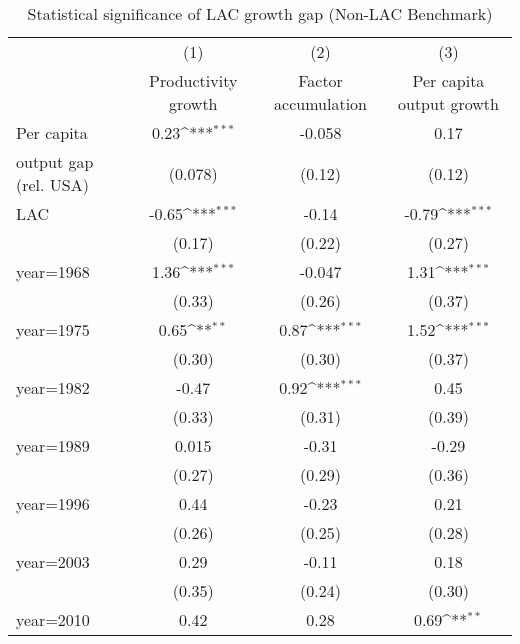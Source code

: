 \begin{table}[htbp]\centering
\def\sym#1{\ifmmode^{#1}\else\(^{#1}\)\fi}
\caption{Statistical significance of LAC growth gap (Non-LAC Benchmark)}
\begin{tabular}{l*{3}{c}}
\toprule
                &\multicolumn{1}{c}{(1)}&\multicolumn{1}{c}{(2)}&\multicolumn{1}{c}{(3)}\\
                &\multicolumn{1}{c}{Productivity growth}&\multicolumn{1}{c}{Factor accumulation}&\multicolumn{1}{c}{Per capita output growth}\\
\midrule
Per capita      &     0.23\sym{***}&   -0.058         &     0.17         \\
output gap (rel. USA)&  (0.078)         &   (0.12)         &   (0.12)         \\
\addlinespace
LAC             &    -0.65\sym{***}&    -0.14         &    -0.79\sym{***}\\
                &   (0.17)         &   (0.22)         &   (0.27)         \\
\addlinespace
year=1968       &     1.36\sym{***}&   -0.047         &     1.31\sym{***}\\
                &   (0.33)         &   (0.26)         &   (0.37)         \\
\addlinespace
year=1975       &     0.65\sym{**} &     0.87\sym{***}&     1.52\sym{***}\\
                &   (0.30)         &   (0.30)         &   (0.37)         \\
\addlinespace
year=1982       &    -0.47         &     0.92\sym{***}&     0.45         \\
                &   (0.33)         &   (0.31)         &   (0.39)         \\
\addlinespace
year=1989       &    0.015         &    -0.31         &    -0.29         \\
                &   (0.27)         &   (0.29)         &   (0.36)         \\
\addlinespace
year=1996       &     0.44         &    -0.23         &     0.21         \\
                &   (0.26)         &   (0.25)         &   (0.28)         \\
\addlinespace
year=2003       &     0.29         &    -0.11         &     0.18         \\
                &   (0.35)         &   (0.24)         &   (0.30)         \\
\addlinespace
year=2010       &     0.42         &     0.28         &     0.69\sym{**} \\

\end{tabular}
\end{table}
